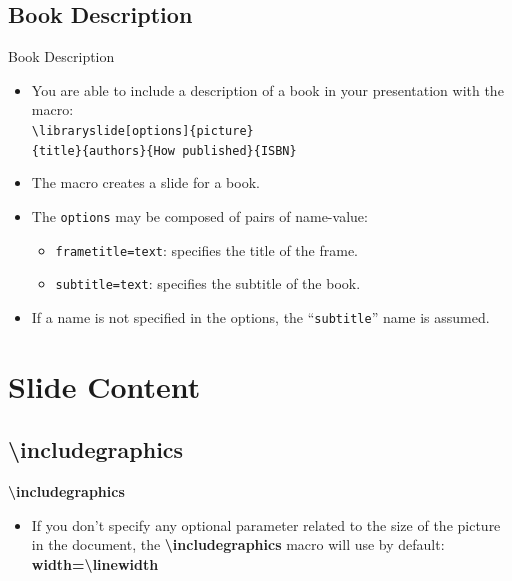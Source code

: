 \documentclass[english,sectioncirclenumberstyle]{ciadbeamer}
\begin{document}
\subsection{Book Description}

\begin{frame}{Book Description}
	\begin{itemize}
	\item You are able to include a description of a book in your presentation with the macro: \\
		\texttt{{\textbackslash}libraryslide[options]\{picture\}} \\
		\texttt{\{title\}\{authors\}\{How published\}\{ISBN\}}
	\vspace{1em}
	\item The macro creates a slide for a book.
	\vspace{1em}
	\item The \texttt{options} may be composed of pairs of name-value:
		\begin{itemize}
		\item \texttt{frametitle=text}: specifies the title of the frame.
		\item \texttt{subtitle=text}: specifies the subtitle of the book.
		\end{itemize}
	\item If a name is not specified in the options, the ``\texttt{subtitle}'' name is assumed.
	\end{itemize}
\end{frame}

\section{Slide Content}
\tableofcontentslide[sectionstyle={show/shaded},subsectionstyle={show/show/hide},subsubsectionstyle={hide/hide/hide/hide},sections={3-}]

\subsection{{\textbackslash}includegraphics}
\tableofcontentslide[sectionstyle={show/shaded},subsectionstyle={show/shaded/hide},subsubsectionstyle={hide/hide/hide/hide},sections={3-}]

\begin{frame}{\textbf{{\textbackslash}includegraphics}}
	\begin{itemize}
	\vspace{2em}
	\item If you don't specify any optional parameter related to the size of the picture in the document, the \textbf{{\textbackslash}includegraphics} macro will use by default: \\
		\textbf{width={\textbackslash}linewidth}
	\end{itemize}
\end{frame}
\end{document}
